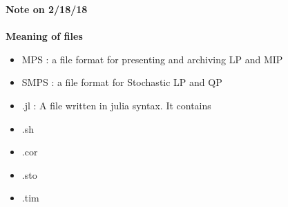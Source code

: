 \documentclass[11pt,english]{article}
\begin{document}
\newpage
{\Large \textbf{Note on 2/18/18}}\\ \\
\textbf{Meaning of files}
\begin{itemize}
	\item MPS : a file format for presenting and archiving LP and MIP
	\item SMPS : a file format for Stochastic LP and QP
	\item .jl : A file written in julia syntax. It contains 
	\item .sh
	\item .cor
	\item .sto
	\item .tim
\end{itemize}
\end{document}
